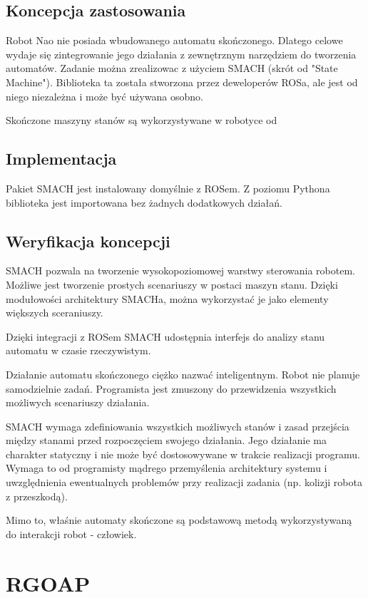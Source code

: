 \subsection{Koncepcja zastosowania}
Robot Nao nie posiada wbudowanego automatu skończonego. Dlatego celowe wydaje się zintegrowanie jego działania z zewnętrznym narzędziem do tworzenia automatów. 
Zadanie można zrealizowac z użyciem SMACH (skrót od "State Machine"). Biblioteka ta została stworzona przez deweloperów ROSa, ale jest od niego niezależna i może być używana osobno. 

Skończone maszyny stanów są wykorzystywane w robotyce od 

\subsection{Implementacja}
Pakiet SMACH jest instalowany domyślnie z ROSem. Z poziomu Pythona biblioteka jest importowana bez żadnych dodatkowych działań.

\subsection{Weryfikacja koncepcji}
SMACH pozwala na tworzenie wysokopoziomowej warstwy sterowania robotem. Możliwe jest tworzenie prostych scenariuszy w postaci maszyn stanu. Dzięki modułowości architektury SMACHa, można wykorzystać je jako elementy większych sceraniuszy. 

Dzięki integracji z ROSem SMACH udostępnia interfejs do analizy stanu automatu w czasie rzeczywistym. 

Działanie automatu skończonego ciężko nazwać inteligentnym. Robot nie planuje samodzielnie zadań. Programista jest zmuszony do przewidzenia wszystkich możliwych scenariuszy działania. 

SMACH wymaga zdefiniowania wszystkich możliwych stanów i zasad przejścia między stanami przed rozpoczęciem swojego działania. Jego działanie ma charakter statyczny i nie może być dostosowywane w trakcie realizacji programu. Wymaga to od programisty mądrego przemyślenia architektury systemu i uwzględnienia ewentualnych problemów przy realizacji zadania (np. kolizji robota z przeszkodą). 

Mimo to, właśnie automaty skończone są podstawową metodą wykorzystywaną do interakcji robot - człowiek.

\section{RGOAP}

